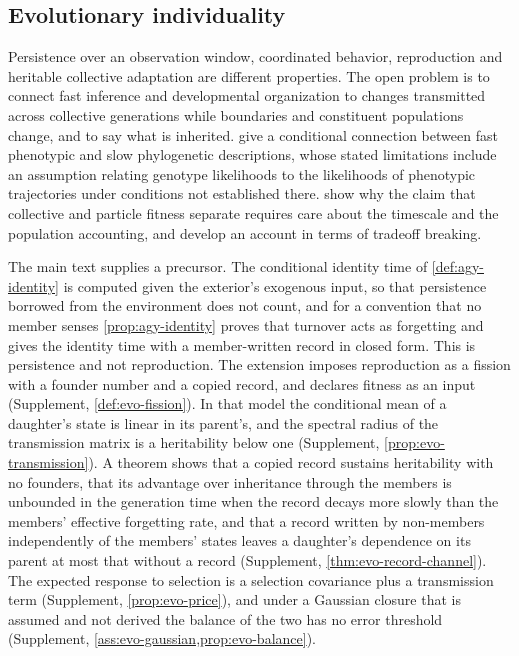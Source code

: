 \subsection{Evolutionary individuality}\label{sec:opn-9}

Persistence over an observation window, coordinated behavior, reproduction and heritable collective adaptation are different properties. The open problem is to connect fast inference and developmental organization to changes transmitted across collective generations while boundaries and constituent populations change, and to say what is inherited. \citet{friston2023variational} give a conditional connection between fast phenotypic and slow phylogenetic descriptions, whose stated limitations include an assumption relating genotype likelihoods to the likelihoods of phenotypic trajectories under conditions not established there. \citet{bourrat2022tradeoff} show why the claim that collective and particle fitness separate requires care about the timescale and the population accounting, and develop an account in terms of tradeoff breaking.

The main text supplies a precursor. The conditional identity time of \cref{def:agy-identity} is computed given the exterior's exogenous input, so that persistence borrowed from the environment does not count, and for a convention that no member senses \cref{prop:agy-identity} proves that turnover acts as forgetting and gives the identity time with a member-written record in closed form. This is persistence and not reproduction. The extension imposes reproduction as a fission with a founder number and a copied record, and declares fitness as an input (Supplement, \cref{def:evo-fission}). In that model the conditional mean of a daughter's state is linear in its parent's, and the spectral radius of the transmission matrix is a heritability below one (Supplement, \cref{prop:evo-transmission}). A theorem shows that a copied record sustains heritability with no founders, that its advantage over inheritance through the members is unbounded in the generation time when the record decays more slowly than the members' effective forgetting rate, and that a record written by non-members independently of the members' states leaves a daughter's dependence on its parent at most that without a record (Supplement, \cref{thm:evo-record-channel}). The expected response to selection is a selection covariance plus a transmission term (Supplement, \cref{prop:evo-price}), and under a Gaussian closure that is assumed and not derived the balance of the two has no error threshold (Supplement, \cref{ass:evo-gaussian,prop:evo-balance}).

